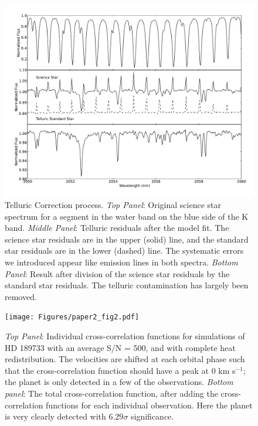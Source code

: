 

\begin{figure}[ht]
  \centering
  \includegraphics[width=6.5in]{Figures/paper2_fig1.pdf}
  \caption{Telluric Correction process. \emph{Top Panel}: Original
    science star spectrum for a segment in the water band on the blue side of the K band.  \emph{Middle Panel}: Telluric residuals
    after the model fit. The science star residuals are in the upper (solid) line, and
    the standard star residuals are in the lower (dashed) line. The systematic errors we introduced appear like emission lines in both spectra. \emph{Bottom Panel}:
    Result after division of the science star residuals by the
    standard star residuals. The telluric contamination has largely been removed.}
  \label{paper2_fig:tellcorr}
\end{figure}


\begin{figure}[ht]
  \centering
  \texttt{[image: Figures/paper2\_fig2.pdf]}
  \caption{\emph{Top Panel}: Individual cross-correlation functions for simulations of HD 189733 with an average S/N = 500, and with complete heat redistribution. The velocities are shifted at each orbital phase such that the cross-correlation function should have a peak at 0 km s$^{-1}$; the planet is only detected in a few of the observations. \emph{Bottom panel}: The total cross-correlation function, after adding the cross-correlation functions for each individual observation. Here the planet is very clearly detected with $6.29 \sigma$ significance.}
  \label{paper2_fig:allcorr}
\end{figure}


